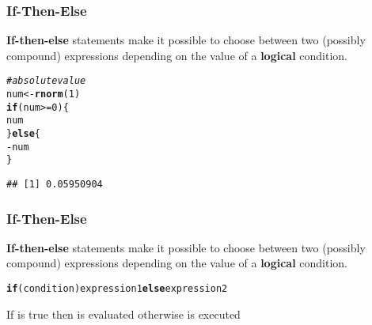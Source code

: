 \documentclass[12pt]{beamer}\usepackage[]{graphicx}\usepackage[]{color}
\makeatletter
\newcommand{\hlnum}[1]{\textcolor[rgb]{0.686,0.059,0.569}{#1}}%
\newcommand{\hlcom}[1]{\textcolor[rgb]{0.678,0.584,0.686}{\textit{#1}}}%
\newcommand{\hlopt}[1]{\textcolor[rgb]{0,0,0}{#1}}%
\newcommand{\hlstd}[1]{\textcolor[rgb]{0.345,0.345,0.345}{#1}}%
\newcommand{\hlkwa}[1]{\textcolor[rgb]{0.161,0.373,0.58}{\textbf{#1}}}%
\newcommand{\hlkwb}[1]{\textcolor[rgb]{0.69,0.353,0.396}{#1}}%
\newcommand{\hlkwd}[1]{\textcolor[rgb]{0.737,0.353,0.396}{\textbf{#1}}}%
\newenvironment{kframe}{%
 \def\at@end@of@kframe{}%
 \ifinner\ifhmode%
  \def\at@end@of@kframe{\end{minipage}}%
  \begin{minipage}{\columnwidth}%
 \fi\fi%
 \def\FrameCommand##1{\hskip\@totalleftmargin \hskip-\fboxsep
 \colorbox{shadecolor}{##1}\hskip-\fboxsep
     \hskip-\linewidth \hskip-\@totalleftmargin \hskip\columnwidth}%
 \MakeFramed {\advance\hsize-\width
   \@totalleftmargin\z@ \linewidth\hsize
   \@setminipage}}%
 {\par\unskip\endMakeFramed%
 \at@end@of@kframe}
\newenvironment{knitrout}{}{} %
\makeatother
\begin{document}
\begin{frame}[fragile]
\frametitle{If-Then-Else}

\textbf{If-then-else} statements make it possible to choose between two (possibly compound) expressions depending on the value of a \textbf{logical} condition.

\begin{knitrout}\footnotesize
{}\color{fgcolor}\begin{kframe}
\begin{alltt}
\hlcom{# absolute value}
\hlstd{num} \hlkwb{<-} \hlkwd{rnorm}\hlstd{(}\hlnum{1}\hlstd{)}
\hlkwa{if} \hlstd{(num} \hlopt{>=} \hlnum{0}\hlstd{) \{}
  \hlstd{num}
\hlstd{\}} \hlkwa{else} \hlstd{\{}
  \hlopt{-}\hlstd{num}
\hlstd{\}}
\end{alltt}
\begin{verbatim}
## [1] 0.05950904
\end{verbatim}
\end{kframe}
\end{knitrout}

\end{frame}


\begin{frame}[fragile]
\frametitle{If-Then-Else}

\textbf{If-then-else} statements make it possible to choose between two (possibly compound) expressions depending on the value of a \textbf{logical} condition.

\begin{knitrout}\footnotesize
{}\color{fgcolor}\begin{kframe}
\begin{alltt}
\hlkwa{if} \hlstd{(condition) expression1} \hlkwa{else} \hlstd{expression2}
\end{alltt}
\end{kframe}
\end{knitrout}

If  is true then  is evaluated otherwise  is executed

\end{frame}

\end{document}
